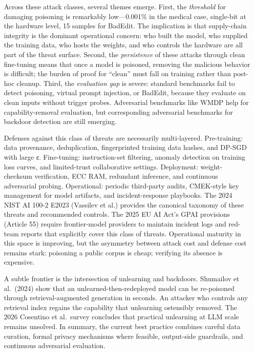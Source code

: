 \documentclass{article}
\begin{document}
Across these attack classes, several themes emerge. First, the \emph{threshold} for damaging poisoning is remarkably low---0.001\% in the medical case, single-bit at the hardware level, 15 samples for BadEdit. The implication is that supply-chain integrity is the dominant operational concern: who built the model, who supplied the training data, who hosts the weights, and who controls the hardware are all part of the threat surface. Second, the \emph{persistence} of these attacks through clean fine-tuning means that once a model is poisoned, removing the malicious behavior is difficult; the burden of proof for ``clean'' must fall on training rather than post-hoc cleanup. Third, the \emph{evaluation gap} is severe: standard benchmarks fail to detect poisoning, virtual prompt injection, or BadEdit, because they evaluate on clean inputs without trigger probes. Adversarial benchmarks like WMDP help for capability-removal evaluation, but corresponding adversarial benchmarks for backdoor detection are still emerging.

Defenses against this class of threats are necessarily multi-layered. Pre-training: data provenance, deduplication, fingerprinted training data hashes, and DP-SGD with large ε. Fine-tuning: instruction-set filtering, anomaly detection on training loss curves, and limited-trust collaborative settings. Deployment: weight-checksum verification, ECC RAM, redundant inference, and continuous adversarial probing. Operational: periodic third-party audits, CMEK-style key management for model artifacts, and incident-response playbooks. The 2024 NIST AI 100-2 E2023 (Vassilev et al.) provides the canonical taxonomy of these threats and recommended controls. The 2025 EU AI Act's GPAI provisions (Article 55) require frontier-model providers to maintain incident logs and red-team reports that explicitly cover this class of threats. Operational maturity in this space is improving, but the asymmetry between attack cost and defense cost remains stark: poisoning a public corpus is cheap; verifying its absence is expensive.

A subtle frontier is the intersection of unlearning and backdoors. Shumailov et al.~(2024) show that an unlearned-then-redeployed model can be re-poisoned through retrieval-augmented generation in seconds. An attacker who controls any retrieval index regains the capability that unlearning ostensibly removed. The 2026 Cosentino et al.~survey concludes that practical unlearning at LLM scale remains unsolved. In summary, the current best practice combines careful data curation, formal privacy mechanisms where feasible, output-side guardrails, and continuous adversarial evaluation.
\end{document}
